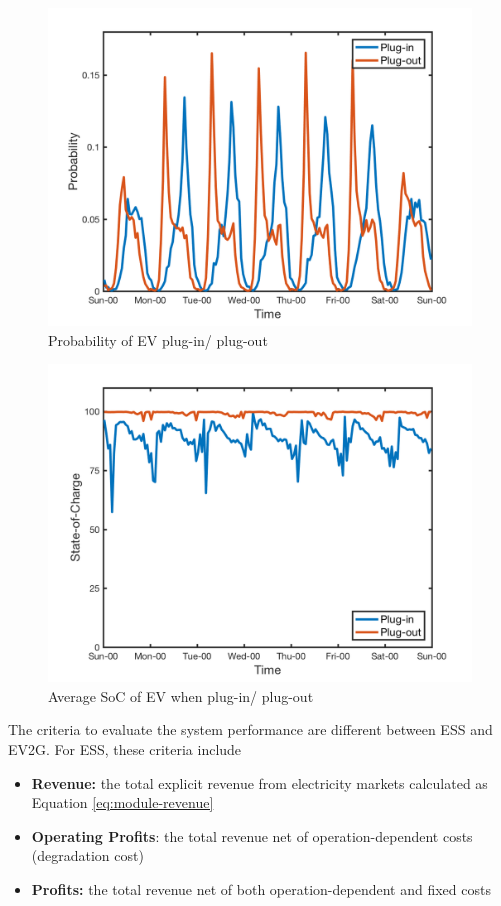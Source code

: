 \begin{figure}[h!]
	\centering
		\centering
		\includegraphics[width=0.8\linewidth]{Figures/Data_EV_number}
		\caption{Probability of EV plug-in/ plug-out}
		\label{fig:data-ev-number}
\end{figure}

\begin{figure}[h!]
	\centering
		\includegraphics[width=0.8\linewidth]{Figures/Data_SoC}
		\caption{Average SoC of EV when plug-in/ plug-out}
		\label{fig:data-soc}
\end{figure}

The criteria to evaluate the system performance are different between ESS and EV2G. For ESS, these criteria include
\begin{itemize}
	\item \textbf{Revenue:} the total explicit revenue from electricity markets calculated as Equation \eqref{eq:module-revenue}
	\item \textbf{Operating Profits}: the total revenue net of operation-dependent costs (degradation cost)
	\item \textbf{Profits:} the total revenue net of both operation-dependent and fixed costs
\end{itemize}

